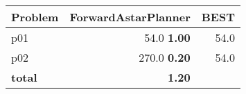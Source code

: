 \begin{tabular}{|l|r|r|}
\hline
\textbf{Problem} & \textbf{ForwardAstarPlanner} & \textbf{BEST}\\
\hline
p01 & {\footnotesize 54.0} \textbf{1.00} & 54.0\\
p02 & {\footnotesize 270.0} \textbf{0.20} & 54.0\\
\hline
\textbf{total} & \textbf{1.20} & \\
\hline
\end{tabular}


